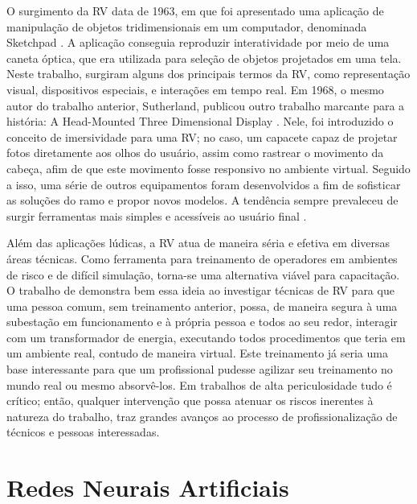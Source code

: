 O surgimento da RV data de 1963, em que foi apresentado uma aplicação de manipulação de objetos tridimensionais em um computador, denominada Sketchpad \cite {sutherland1963sketchpad}. A aplicação conseguia reproduzir interatividade por meio de uma caneta óptica, que era utilizada para seleção de objetos projetados em uma tela. Neste trabalho, surgiram alguns dos principais termos da RV, como representação visual, dispositivos especiais, e interações em tempo real. Em 1968, o mesmo autor do trabalho anterior, Sutherland, publicou outro trabalho marcante para a história: A Head-Mounted Three Dimensional Display \cite{sutherland1968head}. Nele, foi introduzido o conceito de imersividade para uma RV; no caso, um capacete capaz de projetar fotos diretamente aos olhos do usuário, assim como rastrear o movimento da cabeça, afim de que este movimento fosse responsivo no ambiente virtual. Seguido a isso, uma série de outros equipamentos foram desenvolvidos a fim de sofisticar as soluções do ramo e propor novos modelos. A tendência sempre prevaleceu de surgir ferramentas mais simples e acessíveis ao usuário final \cite{kirner2011evoluccao}.

Além das aplicações lúdicas, a RV atua de maneira séria e efetiva em diversas áreas técnicas. Como ferramenta para treinamento de operadores em ambientes de risco e de difícil simulação, torna-se uma alternativa viável para capacitação.  O trabalho de \cite{silva2012virtual} demonstra bem essa ideia ao investigar técnicas de RV para que uma pessoa comum, sem treinamento anterior, possa, de maneira segura à uma subestação em funcionamento e à própria pessoa e todos ao seu redor, interagir com um transformador de energia, executando todos procedimentos que teria em um ambiente real, contudo de maneira virtual. Este treinamento já seria uma base interessante para que um profissional pudesse agilizar seu treinamento no mundo real ou mesmo absorvê-los. Em trabalhos de alta periculosidade tudo é crítico; então, qualquer intervenção que possa atenuar os riscos inerentes à natureza do trabalho, traz grandes avanços ao processo de profissionalização de técnicos e pessoas interessadas. 

\section{Redes Neurais Artificiais}
\label{sec:redesneurais}

